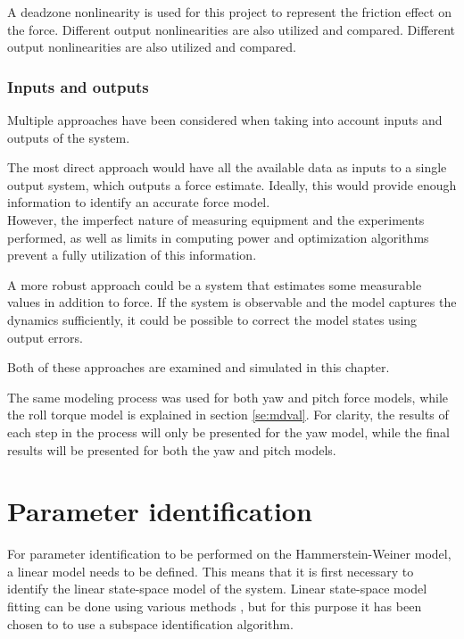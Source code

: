 A deadzone nonlinearity is used for this project to represent the friction effect on the force.
Different output nonlinearities are also utilized and compared.
Different output nonlinearities are also utilized and compared.

\subsubsection{Inputs and outputs}
Multiple approaches have been considered when taking into account inputs and outputs of the system.

The most direct approach would have all the available data as inputs to a single output system, which outputs a force estimate.
Ideally, this would provide enough information to identify an accurate force model.\\
However, the imperfect nature of measuring equipment and the experiments performed, as well as limits in computing power and optimization algorithms prevent a fully utilization of this information.

A more robust approach could be a system that estimates some measurable values in addition to force.
If the system is observable and the model captures the dynamics sufficiently, it could be possible to correct the model states using output errors.

Both of these approaches are examined and simulated in this chapter.

The same modeling process was used for both yaw and pitch force models, while the roll torque model is explained in section \ref{se:mdval}.
For clarity, the results of each step in the process will only be presented for the yaw model, while the final results will be presented for both the yaw and pitch models. 

\section{Parameter identification}\label{sec:para_iden}

For parameter identification to be performed on the Hammerstein-Weiner model, a linear model needs to be defined.
This means that it is first necessary to identify the linear state-space model of the system.
Linear state-space model fitting can be done using various methods , but for this purpose it has been chosen to to use a subspace identification algorithm.

